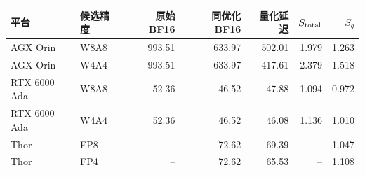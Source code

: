 \begin{tabular}{llrrrrr}
\toprule
平台 & 候选精度 & 原始 BF16 & 同优化 BF16 & 量化延迟 & $S_{\rm total}$ & $S_q$ \\
\midrule
AGX Orin & W8A8 & 993.51 & 633.97 & 502.01 & 1.979 & 1.263 \\
AGX Orin & W4A4 & 993.51 & 633.97 & 417.61 & 2.379 & 1.518 \\
RTX 6000 Ada & W8A8 & 52.36 & 46.52 & 47.88 & 1.094 & 0.972 \\
RTX 6000 Ada & W4A4 & 52.36 & 46.52 & 46.08 & 1.136 & 1.010 \\
Thor & FP8 & -- & 72.62 & 69.39 & -- & 1.047 \\
Thor & FP4 & -- & 72.62 & 65.53 & -- & 1.108 \\
\bottomrule
\end{tabular}
